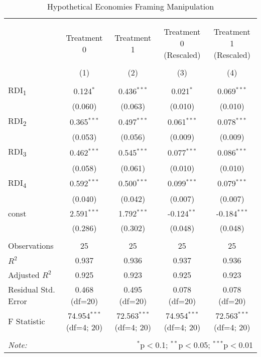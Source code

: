 \begin{table}[!htbp]
\centering
\caption{Hypothetical Economies Framing Manipulation}

\begin{tabular}{@{\extracolsep{2pt}}lcccc}
\\[-1.8ex]\hline
\hline \\[-1.8ex]
\\[-1.8ex] & \multicolumn{1}{c}{Treatment 0} & \multicolumn{1}{c}{Treatment 1} & \multicolumn{1}{c}{Treatment 0 (Rescaled)} & \multicolumn{1}{c}{Treatment 1 (Rescaled)}  \\
\\[-1.8ex] & (1) & (2) & (3) & (4) \\
\hline \\[-1.8ex]
 RDI\textsubscript{1} & 0.124$^{*}$ & 0.436$^{***}$ & 0.021$^{*}$ & 0.069$^{***}$ \\
& (0.060) & (0.063) & (0.010) & (0.010) \\
 RDI\textsubscript{2} & 0.365$^{***}$ & 0.497$^{***}$ & 0.061$^{***}$ & 0.078$^{***}$ \\
& (0.053) & (0.056) & (0.009) & (0.009) \\
 RDI\textsubscript{3} & 0.462$^{***}$ & 0.545$^{***}$ & 0.077$^{***}$ & 0.086$^{***}$ \\
& (0.058) & (0.061) & (0.010) & (0.010) \\
 RDI\textsubscript{4} & 0.592$^{***}$ & 0.500$^{***}$ & 0.099$^{***}$ & 0.079$^{***}$ \\
& (0.040) & (0.042) & (0.007) & (0.007) \\
 const & 2.591$^{***}$ & 1.792$^{***}$ & -0.124$^{**}$ & -0.184$^{***}$ \\
& (0.286) & (0.302) & (0.048) & (0.048) \\
\hline \\[-1.8ex]
 Observations & 25 & 25 & 25 & 25 \\
 $R^2$ & 0.937 & 0.936 & 0.937 & 0.936 \\
 Adjusted $R^2$ & 0.925 & 0.923 & 0.925 & 0.923 \\
 Residual Std. Error & 0.468 (df=20) & 0.495 (df=20) & 0.078 (df=20) & 0.078 (df=20) \\
 F Statistic & 74.954$^{***}$ (df=4; 20) & 72.563$^{***}$ (df=4; 20) & 74.954$^{***}$ (df=4; 20) & 72.563$^{***}$ (df=4; 20) \\
\hline
\hline \\[-1.8ex]
\textit{Note:} & \multicolumn{4}{r}{$^{*}$p$<$0.1; $^{**}$p$<$0.05; $^{***}$p$<$0.01} \\
\end{tabular}
\end{table}